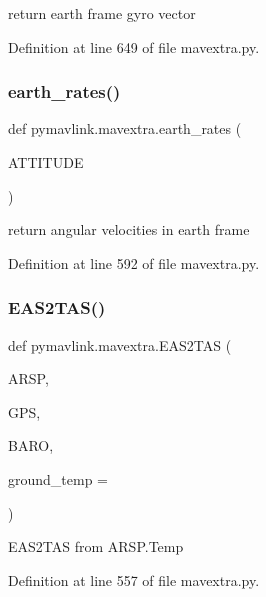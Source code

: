 \begin{DoxyVerb}return earth frame gyro vector\end{DoxyVerb}
 

Definition at line 649 of file mavextra.\+py.

\mbox{\label{namespacepymavlink_1_1mavextra_ada9a5936b18dd8a99085b06b9b687573}} 
\subsubsection{\texorpdfstring{earth\_rates()}{earth\_rates()}}
{\footnotesize\ttfamily def pymavlink.\+mavextra.\+earth\+\_\+rates (\begin{DoxyParamCaption}\item[{}]{A\+T\+T\+I\+T\+U\+DE }\end{DoxyParamCaption})}

\begin{DoxyVerb}return angular velocities in earth frame\end{DoxyVerb}
 

Definition at line 592 of file mavextra.\+py.

\mbox{\label{namespacepymavlink_1_1mavextra_a7d43fc6d74cca81b49d9528bfbe97193}} 
\subsubsection{\texorpdfstring{EAS2TAS()}{EAS2TAS()}}
{\footnotesize\ttfamily def pymavlink.\+mavextra.\+E\+A\+S2\+T\+AS (\begin{DoxyParamCaption}\item[{}]{A\+R\+SP,  }\item[{}]{G\+PS,  }\item[{}]{B\+A\+RO,  }\item[{}]{ground\+\_\+temp = {} }\end{DoxyParamCaption})}

\begin{DoxyVerb}EAS2TAS from ARSP.Temp\end{DoxyVerb}
 

Definition at line 557 of file mavextra.\+py.

